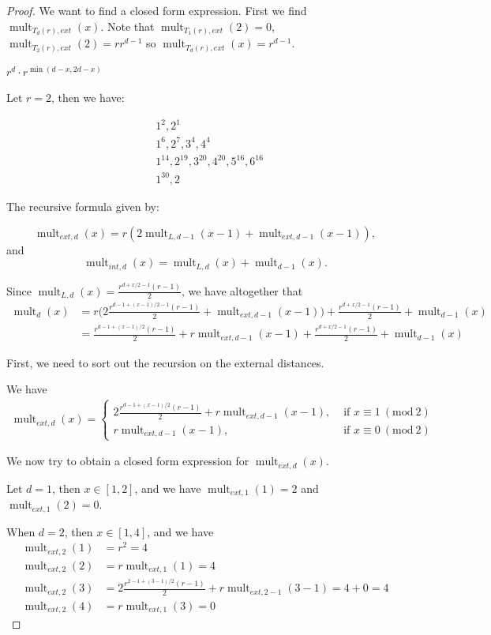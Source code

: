 \documentclass[12]{article}
\newcommand{\Mod}[1]{\ (\mathrm{mod}\ #1)}
\DeclareMathOperator{\mult}{mult}
\theoremstyle{definition}
\begin{document}
\begin{proof}
		We want to find a closed form expression.  First we find $\mult_{T_{d}(r),ext}(x)$.  Note that $\mult_{T_{1}(r),ext}(2) = 0$, $\mult_{T_{2}(r),ext}(2) = rr^{d-1}$ so $\mult_{T_{d}(r),ext}(x) = r^{d-1}$.
		
		$r^d \cdot r^{\min(d-x,2d-x)}$
		
		Let $r=2$, then we have:
		
		\begin{align*}
			&1^2, 2^1	\\
			&1^6, 2^7, 3^4, 4^4	\\
			&1^{14}, 2^{19}, 3^{20}, 4^{20}, 5^{16}, 6^{16}	\\
			&1^{30}, 2^{}
		\end{align*}
	
	The recursive formula given by:
	
	$$\mult_{ext,d}(x) = r(2\mult_{L,d-1}(x-1) + \mult_{ext,d-1}(x-1)),$$
	and
	$$\mult_{int,d}(x) = \mult_{L,d}(x) + \mult_{d-1}(x).$$
	
	Since $\mult_{L,d}(x) = \frac{r^{d+x/2-1}(r-1)}{2}$, we have altogether that
	\begin{align*}
		\mult_d(x) &= r\biggr(2\frac{r^{d-1+(x-1)/2-1}(r-1)}{2} + \mult_{ext,d-1}(x-1)\biggr) + \frac{r^{d+x/2-1}(r-1)}{2} + \mult_{d-1}(x)	\\
		&= \frac{r^{d-1+(x-1)/2}(r-1)}{2} + r\mult_{ext,d-1}(x-1) + \frac{r^{d+x/2-1}(r-1)}{2} + \mult_{d-1}(x)
	\end{align*}
	
	First, we need to sort out the recursion on the external distances.
	
	We have
	\begin{align*}
		\mult_{ext,d}(x) = \begin{cases}
			2\frac{r^{d-1+(x-1)/2}(r-1)}{2} + r\mult_{ext,d-1}(x-1), &\text{ if } x \equiv 1 \Mod{2} \\
			r\mult_{ext,d-1}(x-1),	&\text{ if } x \equiv 0 \Mod{2}
		\end{cases}
	\end{align*}
	 
	
	We now try to obtain a closed form expression for $\mult_{ext,d}(x)$.
	
	Let $d=1$, then $x \in [1,2]$, and we have $\mult_{ext,1}(1) = 2$ and $\mult_{ext,1}(2) = 0$.
	
	When $d=2$, then $x \in [1,4]$, and we have
	\begin{align*}
		\mult_{ext,2}(1) &= r^2 = 4	\\
		\mult_{ext,2}(2) &= r \mult_{ext,1}(1) = 4	\\
		\mult_{ext,2}(3) &= 2\frac{r^{2-1+(3-1)/2}(r-1)}{2} + r\mult_{ext,2-1}(3-1) = 4 + 0 = 4\\
		\mult_{ext,2}(4) &= r\mult_{ext,1}(3) = 0
	\end{align*}


\end{proof}
\end{document}
